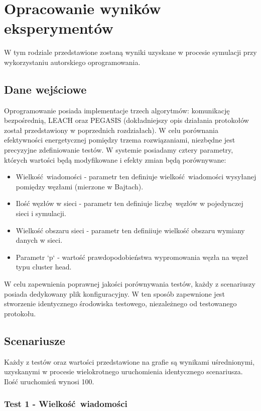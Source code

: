 \documentclass[a4paper,12pt,twoside,openany]{report}
\begin{document}
\chapter{Opracowanie wyników eksperymentów}

W tym rodziale przedstawione zostaną wyniki uzyskane w procesie symulacji przy wykorzystaniu autorskiego oprogramowania.

\section{Dane wejściowe}

Oprogramowanie posiada implementacje trzech algorytmów: komunikację bezpośrednią, LEACH oraz PEGASIS (dokładniejszy opis działania protokołów został przedstawiony w poprzednich rozdziałach).
W celu porównania efektywności energetycznej pomiędzy trzema rozwiązaniami, niezbędne jest precyzyjne zdefiniowanie testów.
W systemie posiadamy cztery parametry, których wartości będą modyfikowane i efekty zmian będą porównywane:

\begin{itemize}
 \item Wielkość wiadomości - parametr ten definiuje wielkość wiadomości wysyłanej pomiędzy węzłami (mierzone w Bajtach).
 \item Ilość węzłów w sieci - parametr ten definiuje liczbę węzłów w pojedynczej sieci i symulacji.
 \item Wielkość obszaru sieci - parametr ten definiiuje wielkość obszaru wymiany danych w sieci.
 \item Parametr `p` - wartość prawdopodobieństwa wypromowania węzła na węzeł typu cluster head.
\end{itemize}

W celu zapewnienia poprawnej jakości porównywania testów, każdy z scenariuszy posiada dedykowany plik konfiguracyjny.
W ten sposób zapewnione jest stworzenie identycznego środowiska testowego, niezależnego od testowanego protokołu.

\section{Scenariusze}

Każdy z testów oraz wartości przedstawione na grafie są wynikami uśrednionymi, uzyskanymi w procesie wielokrotnego uruchomienia identycznego scenariusza.
Ilość uruchomień wynosi 100.

\subsection{Test 1 - Wielkość wiadomości}
\end{document}
